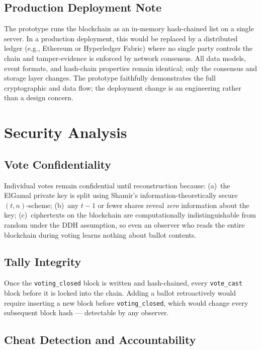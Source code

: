 \documentclass[12pt,a4paper]{article}
\theoremstyle{definition}
\theoremstyle{remark}
\begin{document}
\subsection{Production Deployment Note}

The prototype runs the blockchain as an in-memory hash-chained list on a
single server. In a production deployment, this would be replaced by a
distributed ledger (e.g., Ethereum or Hyperledger Fabric) where no single
party controls the chain and tamper-evidence is enforced by network
consensus. All data models, event formats, and hash-chain properties
remain identical; only the consensus and storage layer changes.
The prototype faithfully demonstrates the full cryptographic and data
flow; the deployment change is an engineering rather than a design concern.

\section{Security Analysis}
\label{sec:security}

\subsection{Vote Confidentiality}

Individual votes remain confidential until reconstruction because:
(a)~the ElGamal private key is split using Shamir's
information-theoretically secure $(t,n)$-scheme;
(b)~any $t-1$ or fewer shares reveal \emph{zero} information about the key;
(c)~ciphertexts on the blockchain are computationally indistinguishable from
random under the DDH assumption, so even an observer who reads the entire
blockchain during voting learns nothing about ballot contents.

\subsection{Tally Integrity}

Once the \texttt{voting\_closed} block is written and hash-chained, every
\texttt{vote\_cast} block before it is locked into the chain.
Adding a ballot retroactively would require inserting a new block before
\texttt{voting\_closed}, which would change every subsequent block hash —
detectable by any observer.

\subsection{Cheat Detection and Accountability}
\end{document}
